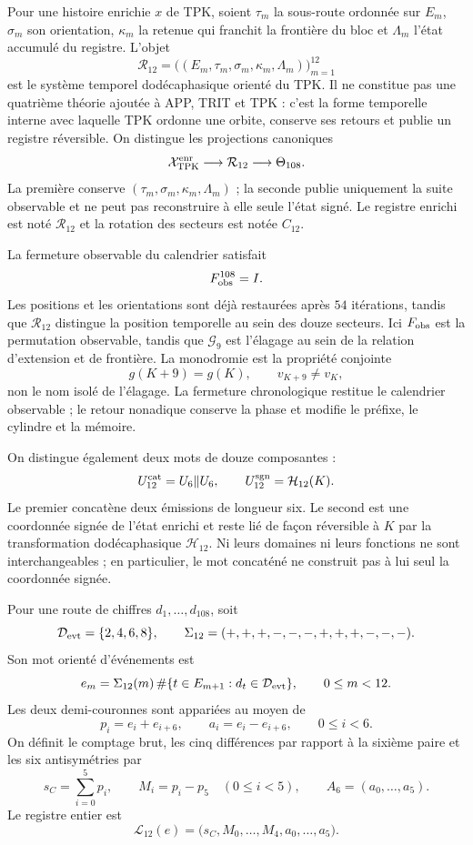 Pour une histoire enrichie \(x\) de TPK, soient \(\tau_m\) la sous-route
ordonnée sur \(E_m\), \(\sigma_m\) son orientation, \(\kappa_m\) la retenue
qui franchit la frontière du bloc et \(\Lambda_m\) l'état accumulé du
registre. L'objet
\[
 \mathcal R_{12}
 =\bigl((E_m,\tau_m,\sigma_m,\kappa_m,\Lambda_m)\bigr)_{m=1}^{12}
\]
est le système temporel dodécaphasique orienté du TPK. Il ne constitue pas une quatrième
théorie ajoutée à APP, TRIT et TPK : c'est la forme temporelle interne avec laquelle
TPK ordonne une orbite, conserve ses retours et publie un registre
réversible. On distingue les projections canoniques
\[
 \mathcal X_{\rm TPK}^{\rm enr}
 \longrightarrow \mathcal R_{12}
 \longrightarrow \Theta_{108}.
\]
La première conserve \((\tau_m,\sigma_m,\kappa_m,\Lambda_m)\) ; la seconde
publie uniquement la suite observable et ne peut pas reconstruire à elle seule
l'état signé. Le registre enrichi est noté \(\mathcal R_{12}\) et la
rotation des secteurs est notée \(C_{12}\).

La fermeture observable du calendrier satisfait
\[
 F_{\rm obs}^{108}=I.
\]
Les positions et les orientations sont déjà restaurées après \(54\) itérations,
tandis que \(\mathcal R_{12}\) distingue la position temporelle au sein des
douze secteurs. Ici \(F_{\rm obs}\) est la permutation observable, tandis que
\(\mathcal G_9\) est l'élagage au sein de la relation d'extension et de frontière.
La monodromie est la propriété conjointe
\[
 g(K+9)=g(K),\qquad v_{K+9}\ne v_K,
\]
non le nom isolé de l'élagage. La fermeture chronologique restitue le calendrier
observable ; le retour nonadique conserve la phase et modifie le préfixe, le cylindre
et la mémoire.

On distingue également deux mots de douze composantes :
\[
 U_{12}^{\rm cat}=U_6\Vert U_6,
 \qquad
 U_{12}^{\rm sgn}=\mathcal H_{12}(K).
\]
Le premier concatène deux émissions de longueur six. Le second est une
coordonnée signée de l'état enrichi et reste lié de façon réversible à
\(K\) par la transformation dodécaphasique \(\mathcal H_{12}\). Ni leurs domaines
ni leurs fonctions ne sont interchangeables ; en particulier, le mot concaténé
ne construit pas à lui seul la coordonnée signée.

\begin{definition}
\label{def:registro-dodecafasico-rev7}
Pour une route de chiffres \(d_1,\ldots,d_{108}\), soit
\[
 \mathcal D_{\rm evt}=\{2,4,6,8\},\qquad
 \Sigma_{12}=(+,+,+,-,-,-,+,+,+,-,-,-).
\]
Son mot orienté d'événements est
\[
 e_m=\Sigma_{12}(m)\,
 \#\{t\in E_{m+1}:d_t\in\mathcal D_{\rm evt}\},
 \qquad 0\le m<12.
\]
Les deux demi-couronnes sont appariées au moyen de
\[
 p_i=e_i+e_{i+6},\qquad
 a_i=e_i-e_{i+6},\qquad 0\le i<6.
\]
On définit le comptage brut, les cinq différences par rapport à la sixième paire et
les six antisymétries par
\[
 s_C=\sum_{i=0}^{5}p_i,\qquad
 M_i=p_i-p_5\quad(0\le i<5),\qquad
 A_6=(a_0,\ldots,a_5).
\]
Le registre entier est
\[
 \mathscr L_{12}(e)
 =\bigl(s_C,M_0,\ldots,M_4,a_0,\ldots,a_5\bigr).
\]
\end{definition}

